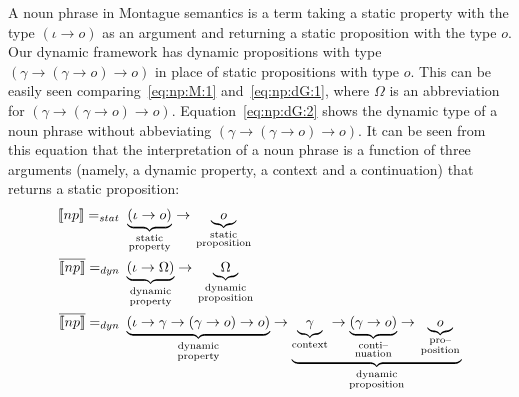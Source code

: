 A noun phrase in Montague semantics is a term taking a static property with the type $(\iota \rightarrow o)$ as an argument and returning a static proposition with the type $o$. Our dynamic framework has dynamic propositions with type $(\gamma \rightarrow (\gamma \rightarrow o) \rightarrow o)$ in place of static propositions with type $o$.
This can be easily seen comparing~\eqref{eq:np:M:1} and~\eqref{eq:np:dG:1}, where $\Omega$ is an abbreviation for $(\gamma \rightarrow (\gamma \rightarrow o) \rightarrow o)$.
Equation~\eqref{eq:np:dG:2} shows the dynamic type of a noun phrase without abbeviating $(\gamma \rightarrow (\gamma \rightarrow o) \rightarrow o)$. It can be seen from this equation that the interpretation of a noun phrase is a function of three arguments (namely, a dynamic property, a context and a continuation) that returns a static proposition:
\begin{subequations}
\begin{align}
[\![np]\!] =_{stat} \ & \underbrace{(\iota \rightarrow   o)}_{
\begin{smallmatrix}
\text{static}\\
\text{property}
\end{smallmatrix}} \rightarrow \underbrace{o}_{\begin{smallmatrix} 
\text{static}\\
\text{proposition}
\end{smallmatrix}} \label{eq:np:M:1} \\
\overline{[\![np]\!]} =_{dyn} \ & \underbrace{(\iota \rightarrow  \Omega )}_{\begin{smallmatrix}
\text{dynamic}\\
\text{property}
\end{smallmatrix}} \rightarrow \underbrace{\Omega}_{
\begin{smallmatrix}
\text{dynamic}\\
\text{proposition}
\end{smallmatrix}} \label{eq:np:dG:1} \\
\overline{[\![np]\!]} =_{dyn} \ & \underbrace{(\iota \rightarrow \gamma \rightarrow (\gamma \rightarrow o) \rightarrow o)}_{
\begin{smallmatrix}
\text{dynamic}\\
\text{property}
\end{smallmatrix}} \rightarrow \underbrace{\underbrace{\gamma}_{\text{context}} \rightarrow \underbrace{(\gamma \rightarrow o)}_{\begin{smallmatrix}
\text{conti--}\\
\text{nuation}
\end{smallmatrix}} \rightarrow \underbrace{o}_{\begin{smallmatrix}
\text{pro--}\\
\text{position}
\end{smallmatrix}}}_{\begin{smallmatrix}
\text{dynamic}\\
\text{proposition}
\end{smallmatrix}} \label{eq:np:dG:2}
\end{align}
\label{eq:np:MdG}
\end{subequations}


